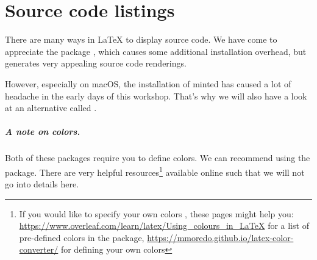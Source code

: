 \chapter{Source code listings}
\label{sec:source-code-listings}

There are many ways in \LaTeX{} to display source code.
We have come to appreciate the package , which causes some additional installation overhead, but generates very appealing source code renderings.

However, especially on macOS, the installation of minted has caused a lot of headache in the early days of this workshop.
That's why we will also have a look at an alternative called .

\paragraph{A note on colors.} Both of these packages require you to define colors. 
We can recommend using the  package.
There are very helpful resources\footnote{If you would like to specify your own colors , these pages might help you: \url{https://www.overleaf.com/learn/latex/Using_colours_in_LaTeX} for a list of pre-defined colors in the  package, \url{https://mmoredo.github.io/latex-color-converter/} for defining your own colors} available online such that we will not go into details here.





